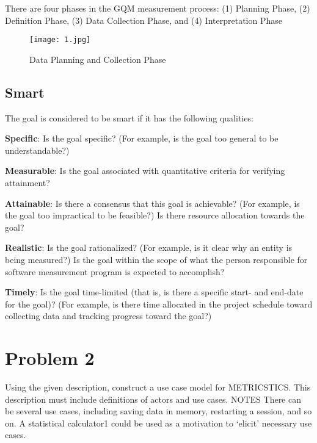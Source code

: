 \documentclass[12pt,letterpaper]{report}
\begin{document}
There are four phases in the GQM measurement process: 
(1) Planning Phase,
(2) Definition Phase, 
(3) Data Collection Phase, and 
(4) Interpretation Phase

\begin{figure}[h]
    \begin{center}
    \texttt{[image: 1.jpg]}
    \end{center}
       \caption{Data Planning and Collection Phase \label{Data Planning and Collection Phase}}
\end{figure}


\subsection{Smart}
The goal is considered to be smart if it has the following qualities:

\textbf{ Specific}: Is the goal specific? (For example, is the goal too general to be understandable?) 	

\textbf{Measurable}: Is the goal associated with quantitative criteria for verifying attainment?

\textbf{Attainable}: Is there a consensus that this goal is achievable? (For example, is the goal too impractical to be feasible?) Is there resource allocation towards the goal?

\textbf{Realistic}: Is the goal rationalized? (For example, is it clear why an entity is being measured?) Is the goal within the scope of what the person responsible for software measurement program is expected to accomplish?

\textbf{Timely}: Is the goal time-limited (that is, is there a specific start- and end-date for the goal)? (For example, is there time allocated in the project schedule toward collecting data and tracking progress toward the goal?) 


\section{Problem 2}


Using the given description, construct a use case model for METRICSTICS. This description must include definitions of actors and use cases. NOTES There can be several use cases, including saving data in memory, restarting a session, and so on. A statistical calculator1 could be used as a motivation to ‘elicit’ necessary use cases. 
\end{document}
